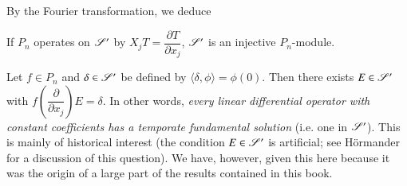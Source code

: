 By the Fourier transformation, we deduce

\setcounter{theorem}{0}
\begin{theorem}\label{chap7-add-thm4.1}
If $P_{n}$ operates on $\mathscr{S}'$ by $X_{j}T=\dfrac{\partial T}{\partial x_{j}}$, $\mathscr{S}'$ is an injective $P_{n}$-module.
\end{theorem}

\begin{example}\label{chap7-exam4.2}
Let $f\in P_{n}$ and $\delta\in \mathscr{S}'$ be defined by $\langle \delta, \phi\rangle=\phi(0)$. Then there exists $E\in \mathscr{S}'$ with $f\left(\dfrac{\partial}{\partial x_{j}}\right)E=\delta$. In other words, {\em every linear differential operator with constant coefficients has a temporate fundamental solution} (i.e. one in $\mathscr{S}'$). This is mainly of historical interest (the condition $E\in \mathscr{S}'$ is artificial; see H\"ormander \cite{key2} for a discussion of this question). We have, however, given this here because it was the origin of a large part of the results contained in this book.
\end{example}

